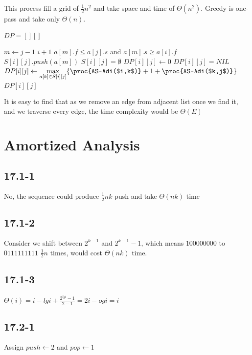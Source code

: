 \documentclass[]{article}
\begin{document}
This process fill a grid of $\frac{1}{2}n^2$ and take space and time of $\Theta(n^2)$. Greedy is one-pass and take only $\Theta(n)$.

\begin{codebox}
	\li $DP = [][]$
	\li \Return {}
\end{codebox}

\begin{codebox}
	\li \For $m \leftarrow j-1$ \Downto $i+1$
	\li \Do \If $a[m].f \le a[j].s$ and $a[m].s \ge a[i].f$
	\li \Then $S[i][j].push(a[m])$ \End \End
	\li \If $S[i][j] = \emptyset$ 
	\li \Then $DP[i][j] \leftarrow 0$
	\li \Else 
	\li \If $DP[i][j] = NIL$
	\li \Then $DP[i][j] \leftarrow \underset{a[k] \in S[i][j]}{\max} \{\proc{AS-Adi($i,k$)} + 1 + \proc{AS-Adi($k,j$)} \} $ \End \End
	\li \Return $DP[i][j]$
	
\end{codebox}

It is easy to find that as we remove an edge from adjacent list once we find it, and we traverse every edge, the time complexity would be $\Theta(E)$

\section{Amortized Analysis}
\subsection{17.1-1}
No, the sequence could produce $\frac{1}{2}nk$ push and take $\Theta(nk)$ time

\subsection{17.1-2}
Consider we shift between $2^{k-1}$ and $2^{k-1} - 1$, which means $100000000$ to $0111111111$ $\frac{1}{2}n$ times, would cost $\Theta(nk)$ time.

\subsection{17.1-3}
$\Theta(i) = i - lgi + \frac{2^{lgi}-1}{2-1} = 2i - ogi = i$

\subsection{17.2-1}
Assign $push \leftarrow 2$ and $pop \leftarrow 1$
\end{document}
